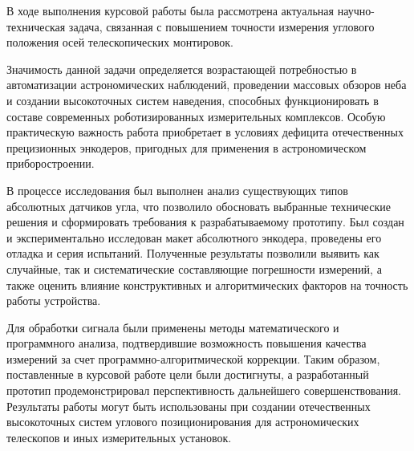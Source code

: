 В ходе выполнения курсовой работы была рассмотрена актуальная научно-техническая задача, связанная с повышением точности измерения углового положения осей телескопических монтировок.

Значимость данной задачи определяется возрастающей потребностью в автоматизации астрономических наблюдений, проведении массовых обзоров неба и создании высокоточных систем наведения, способных функционировать в составе современных роботизированных измерительных комплексов. Особую практическую важность работа приобретает в условиях дефицита отечественных прецизионных энкодеров, пригодных для применения в астрономическом приборостроении.

В процессе исследования был выполнен анализ существующих типов абсолютных датчиков угла, что позволило обосновать выбранные технические решения и сформировать требования к разрабатываемому прототипу. Был создан и экспериментально исследован макет абсолютного энкодера, проведены его отладка и серия испытаний. Полученные результаты позволили выявить как случайные, так и систематические составляющие погрешности измерений, а также оценить влияние конструктивных и алгоритмических факторов на точность работы устройства.

Для обработки сигнала были применены методы математического и программного анализа, подтвердившие возможность повышения качества измерений за счет программно-алгоритмической коррекции. Таким образом, поставленные в курсовой работе цели были достигнуты, а разработанный прототип продемонстрировал перспективность дальнейшего совершенствования. Результаты работы могут быть использованы при создании отечественных высокоточных систем углового позиционирования для астрономических телескопов и иных измерительных установок.